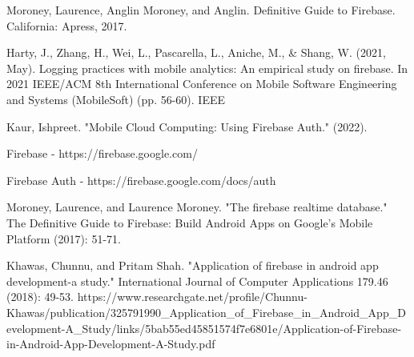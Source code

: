 \documentclass[runningheads]{llncs}
\begin{document}
%
%
%
% 
% 
%
\begin{thebibliography}{8}
Moroney, Laurence, Anglin Moroney, and Anglin. Definitive Guide to Firebase. California: Apress, 2017. 

Harty, J., Zhang, H., Wei, L., Pascarella, L., Aniche, M., & Shang, W. (2021, May). Logging practices with mobile analytics: An empirical study on firebase. In 2021 IEEE/ACM 8th International Conference on Mobile Software Engineering and Systems (MobileSoft) (pp. 56-60). IEEE

Kaur, Ishpreet. "Mobile Cloud Computing: Using Firebase Auth." (2022).

Firebase - https://firebase.google.com/

Firebase Auth - https://firebase.google.com/docs/auth

Moroney, Laurence, and Laurence Moroney. "The firebase realtime database." The Definitive Guide to Firebase: Build Android Apps on Google's Mobile Platform (2017): 51-71.

Khawas, Chunnu, and Pritam Shah. "Application of firebase in android app development-a study." International Journal of Computer Applications 179.46 (2018): 49-53. https://www.researchgate.net/profile/Chunnu-Khawas/publication/325791990_Application_of_Firebase_in_Android_App_Development-A_Study/links/5bab55ed45851574f7e6801e/Application-of-Firebase-in-Android-App-Development-A-Study.pdf

\end{thebibliography}
\end{document}
